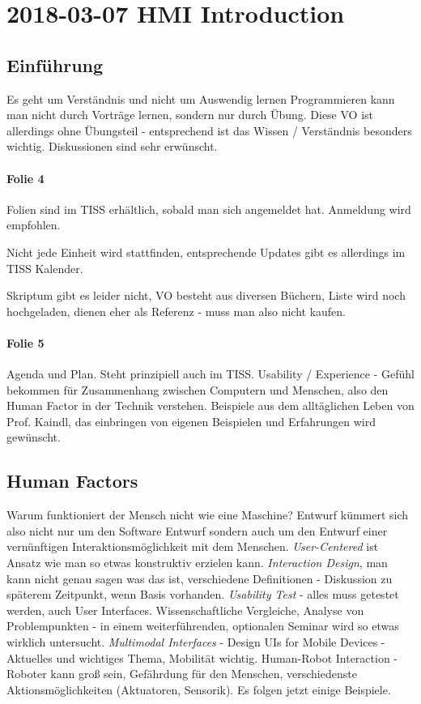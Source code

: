 \section{2018-03-07 HMI Introduction}
\subsection{Einführung}
Es geht um Verständnis und nicht um Auswendig lernen
Programmieren kann man nicht durch Vorträge lernen, sondern nur durch Übung.
Diese VO ist allerdings ohne Übungsteil - entsprechend ist das Wissen / Verständnis besonders wichtig. 
Diskussionen sind sehr erwünscht.

\paragraph{Folie 4}
Folien sind im TISS erhältlich, sobald man sich angemeldet hat. Anmeldung wird
empfohlen.

Nicht jede Einheit wird stattfinden, entsprechende Updates gibt es allerdings
im TISS Kalender. 

Skriptum gibt es leider nicht, VO besteht aus diversen Büchern, Liste wird noch
hochgeladen, dienen eher als Referenz - muss man also nicht kaufen.

\paragraph{Folie 5}
Agenda und Plan. Steht prinzipiell auch im TISS.
Usability / Experience - Gefühl bekommen für Zusammenhang zwischen Computern und Menschen, also den Human Factor in der Technik verstehen.
Beispiele aus dem alltäglichen Leben von Prof. Kaindl, das einbringen von eigenen Beispielen und Erfahrungen wird gewünscht.

\subsection{Human Factors}
Warum funktioniert der Mensch nicht wie eine Maschine? 
Entwurf kümmert sich also nicht nur um den Software Entwurf sondern auch um den Entwurf einer vernünftigen Interaktionsmöglichkeit mit dem Menschen. 
\textit{User-Centered} ist Ansatz wie man so etwas konstruktiv erzielen kann. 
\textit{Interaction Design}, man kann nicht genau sagen was das ist, verschiedene Definitionen - Diskussion zu späterem Zeitpunkt, wenn Basis vorhanden.
\textit{Usability Test} - alles muss getestet werden, auch User Interfaces.
Wissenschaftliche Vergleiche, Analyse von Problempunkten - in einem weiterführenden, optionalen Seminar wird so etwas wirklich untersucht.
\textit{Multimodal Interfaces} - 
Design UIs for Mobile Devices - Aktuelles und wichtiges Thema, Mobilität wichtig.
Human-Robot Interaction - Roboter kann groß sein, Gefährdung für den Menschen,
verschiedenste Aktionsmöglichkeiten (Aktuatoren, Sensorik).
Es folgen jetzt einige Beispiele.

